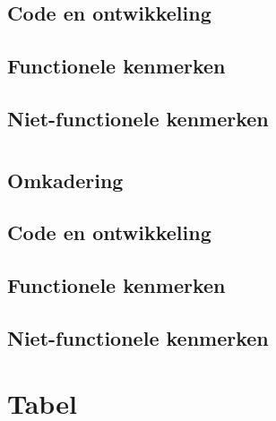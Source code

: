 \subsection{Code en ontwikkeling}
\subsection{Functionele kenmerken}
\subsection{Niet-functionele kenmerken}

\section{\lungo}
\label{sec:raamwerk-lungo}

\subsection{Omkadering}
\subsection{Code en ontwikkeling}
\subsection{Functionele kenmerken}
\subsection{Niet-functionele kenmerken}

\section{Tabel}
\label{sec:raamwerken-tabel}
